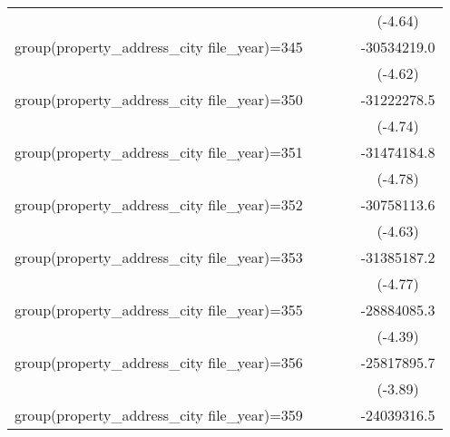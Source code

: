 {\begin{tabular}{l*{4}{c}}
                    &                     &                     &                     &     (-4.64)         \\
\addlinespace
group(property\_address\_city file\_year)=345&                     &                     &                     & -30534219.0\sym{***}\\
                    &                     &                     &                     &     (-4.62)         \\
\addlinespace
group(property\_address\_city file\_year)=350&                     &                     &                     & -31222278.5\sym{***}\\
                    &                     &                     &                     &     (-4.74)         \\
\addlinespace
group(property\_address\_city file\_year)=351&                     &                     &                     & -31474184.8\sym{***}\\
                    &                     &                     &                     &     (-4.78)         \\
\addlinespace
group(property\_address\_city file\_year)=352&                     &                     &                     & -30758113.6\sym{***}\\
                    &                     &                     &                     &     (-4.63)         \\
\addlinespace
group(property\_address\_city file\_year)=353&                     &                     &                     & -31385187.2\sym{***}\\
                    &                     &                     &                     &     (-4.77)         \\
\addlinespace
group(property\_address\_city file\_year)=355&                     &                     &                     & -28884085.3\sym{***}\\
                    &                     &                     &                     &     (-4.39)         \\
\addlinespace
group(property\_address\_city file\_year)=356&                     &                     &                     & -25817895.7\sym{***}\\
                    &                     &                     &                     &     (-3.89)         \\
\addlinespace
group(property\_address\_city file\_year)=359&                     &                     &                     & -24039316.5\sym{***}\\

\end{tabular}}

